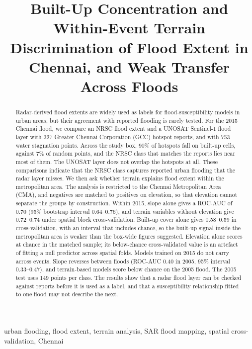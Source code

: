 \documentclass[conference]{IEEEtran}
\title{Built-Up Concentration and Within-Event Terrain Discrimination of Flood Extent in Chennai, and Weak Transfer Across Floods}
\author{\IEEEauthorblockN{Aviraj Bandyopadhyay}
\IEEEauthorblockA{\textit{School of Computer Science and Engineering} \\
\textit{Vellore Institute of Technology}\\
Chennai, India \\
[TODO: email]}}
\begin{document}
\maketitle

\begin{abstract}
Radar-derived flood extents are widely used as labels for flood-susceptibility models in urban areas, but their agreement with reported flooding is rarely tested. For the 2015 Chennai flood, we compare an NRSC flood extent and a UNOSAT Sentinel-1 flood layer with 327 Greater Chennai Corporation (GCC) hotspot reports, and with 753 water stagnation points. Across the study box, 90\% of hotspots fall on built-up cells, against 7\% of random points, and the NRSC class that matches the reports lies near most of them. The UNOSAT layer does not overlap the hotspots at all. These comparisons indicate that the NRSC class captures reported urban flooding that the radar layer misses. We then ask whether terrain explains flood extent within the metropolitan area. The analysis is restricted to the Chennai Metropolitan Area (CMA), and negatives are matched to positives on elevation, so that elevation cannot separate the groups by construction. Within 2015, slope alone gives a ROC-AUC of 0.70 (95\% bootstrap interval 0.64--0.76), and terrain variables without elevation give 0.72--0.74 under spatial block cross-validation. Built-up cover alone gives 0.58--0.59 in cross-validation, with an interval that includes chance, so the built-up signal inside the metropolitan area is weaker than the box-wide figures suggested. Elevation alone scores at chance in the matched sample; its below-chance cross-validated value is an artefact of fitting a null predictor across spatial folds. Models trained on 2015 do not carry across events. Slope reverses between floods (ROC-AUC 0.40 in 2005, 95\% interval 0.33--0.47), and terrain-based models score below chance on the 2005 flood. The 2005 test uses 149 points per class. The results show that a radar flood layer can be checked against reports before it is used as a label, and that a susceptibility relationship fitted to one flood may not describe the next.
\end{abstract}

\begin{IEEEkeywords}
urban flooding, flood extent, terrain analysis, SAR flood mapping, spatial cross-validation, Chennai
\end{IEEEkeywords}
\end{document}
